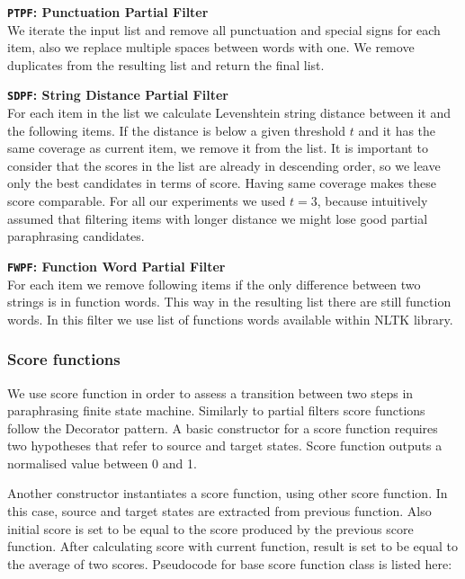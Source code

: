 \begin{flushleft}

\textbf{\texttt{PTPF}: \textbf{Punctuation Partial Filter}} \\
We iterate the input list and remove all punctuation and special signs for each item, also we replace multiple spaces between words with one. We remove duplicates from the resulting list and return the final list.\\
\bigskip 
\bigskip 

\textbf{\texttt{SDPF}: \textbf{String Distance Partial Filter}} \\
For each item in the list we calculate Levenshtein string distance between it and the following items. If the distance is below a given threshold $t$ and it has the same coverage as current item, we remove it from the list. It is important to consider that the scores in the list are already in descending order, so we leave only the best candidates in terms of score. Having same coverage makes these score comparable. For all our experiments we used $t = 3$, because intuitively assumed that filtering items with longer distance we might lose good partial paraphrasing candidates. \\
\bigskip 

\textbf{\texttt{FWPF}: \textbf{Function Word Partial Filter}} \\
For each item we remove following items if the only difference between two strings is in function words. This way in the resulting list there are still function words. In this filter we use list of functions words available within NLTK library. \\
\bigskip 

\end{flushleft} 

\subsubsection{Score functions}

We use score function in order to assess a transition between two steps in paraphrasing finite state machine. Similarly to partial filters score functions follow the Decorator pattern. A basic constructor for a score function requires two hypotheses that refer to source and target states. Score function outputs a normalised value between 0 and 1. 

Another constructor instantiates a score function, using other score function. In this case, source and target states are extracted from previous function. Also initial score is set to be equal to the score produced by the previous score function. After calculating score with current function, result is set to be equal to the average of two scores. Pseudocode for base score function class is listed here:

